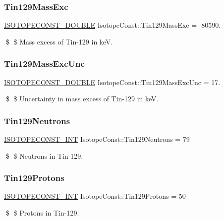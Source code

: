 \subsubsection{\texorpdfstring{Tin129\+Mass\+Exc}{Tin129MassExc}}
{\footnotesize\ttfamily \mbox{\hyperlink{group___isotope_const-_macros_ga8f45a7272ce02c0b4c65c44636ed719a}{I\+S\+O\+T\+O\+P\+E\+C\+O\+N\+S\+T\+\_\+\+D\+O\+U\+B\+LE}} Isotope\+Const\+::\+Tin129\+Mass\+Exc = -\/80590.}

\$ \$ Mass excess of Tin-\/129 in keV. \mbox{\label{group___isotope_const-_tin-_sn129_ga939fb156d43616aabfbff59b92f686e0}} 
\subsubsection{\texorpdfstring{Tin129\+Mass\+Exc\+Unc}{Tin129MassExcUnc}}
{\footnotesize\ttfamily \mbox{\hyperlink{group___isotope_const-_macros_ga8f45a7272ce02c0b4c65c44636ed719a}{I\+S\+O\+T\+O\+P\+E\+C\+O\+N\+S\+T\+\_\+\+D\+O\+U\+B\+LE}} Isotope\+Const\+::\+Tin129\+Mass\+Exc\+Unc = 17.}

\$ \$ Uncertainty in mass excess of Tin-\/129 in keV. \mbox{\label{group___isotope_const-_tin-_sn129_ga6270f920e5eb0c63471cedc2dd4c8d58}} 
\subsubsection{\texorpdfstring{Tin129\+Neutrons}{Tin129Neutrons}}
{\footnotesize\ttfamily \mbox{\hyperlink{group___isotope_const-_macros_ga5f18360b3e99483a35c32d789e62621c}{I\+S\+O\+T\+O\+P\+E\+C\+O\+N\+S\+T\+\_\+\+I\+NT}} Isotope\+Const\+::\+Tin129\+Neutrons = 79}

\$ \$ Neutrons in Tin-\/129. \mbox{\label{group___isotope_const-_tin-_sn129_ga9308d13e959d4481e3b6ae550fe661cb}} 
\subsubsection{\texorpdfstring{Tin129\+Protons}{Tin129Protons}}
{\footnotesize\ttfamily \mbox{\hyperlink{group___isotope_const-_macros_ga5f18360b3e99483a35c32d789e62621c}{I\+S\+O\+T\+O\+P\+E\+C\+O\+N\+S\+T\+\_\+\+I\+NT}} Isotope\+Const\+::\+Tin129\+Protons = 50}

\$ \$ Protons in Tin-\/129. 